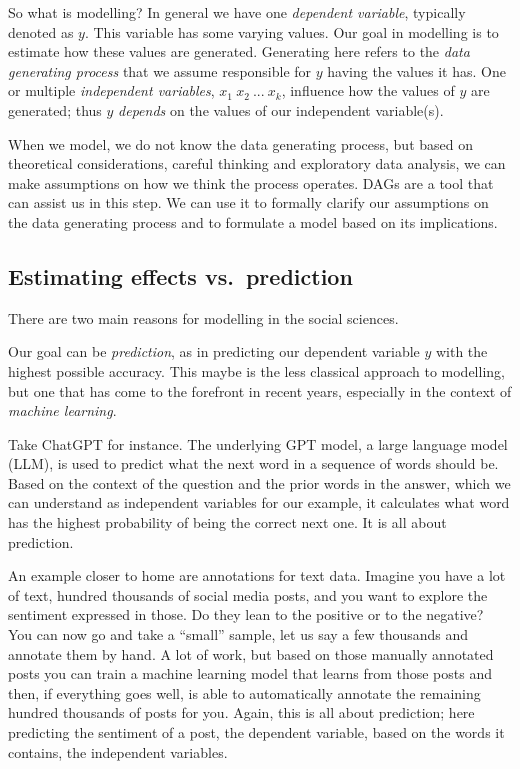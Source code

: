 \documentclass[
]{book}
\begin{document}
So what is modelling? In general we have one \emph{dependent variable}, typically
denoted as \(y\). This variable has some varying values. Our goal in modelling is
to estimate how these values are generated. Generating here refers to the
\emph{data generating process} that we assume responsible for \(y\) having the values
it has. One or multiple \emph{independent variables}, \(x_1 \ x_2 \ ... \ x_k\),
influence how the values of \(y\) are generated; thus \(y\) \emph{depends} on the values
of our independent variable(s).

When we model, we do not know the data generating process, but based on
theoretical considerations, careful thinking and exploratory data analysis, we
can make assumptions on how we think the process operates. DAGs are a tool that
can assist us in this step. We can use it to formally clarify our assumptions on
the data generating process and to formulate a model based on its implications.

\hypertarget{estimating-effects-vs.-prediction}{%
\subsection{Estimating effects vs.~prediction}\label{estimating-effects-vs.-prediction}}

There are two main reasons for modelling in the social sciences.

Our goal can be \emph{prediction}, as in predicting our dependent variable \(y\) with
the highest possible accuracy. This maybe is the less classical approach to
modelling, but one that has come to the forefront in recent years, especially in
the context of \emph{machine learning}.

Take ChatGPT for instance. The underlying GPT model, a large language model
(LLM), is used to predict what the next word in a sequence of words should be.
Based on the context of the question and the prior words in the answer, which we
can understand as independent variables for our example, it calculates what word
has the highest probability of being the correct next one. It is all about
prediction.

An example closer to home are annotations for text data. Imagine you have a lot
of text, hundred thousands of social media posts, and you want to explore the
sentiment expressed in those. Do they lean to the positive or to the negative?
You can now go and take a ``small'' sample, let us say a few thousands and
annotate them by hand. A lot of work, but based on those manually annotated
posts you can train a machine learning model that learns from those posts and
then, if everything goes well, is able to automatically annotate the remaining
hundred thousands of posts for you. Again, this is all about prediction; here
predicting the sentiment of a post, the dependent variable, based on the words
it contains, the independent variables.
\end{document}
